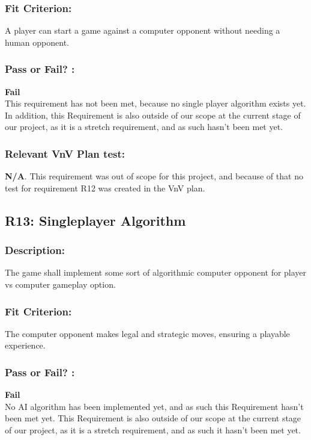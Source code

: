 \documentclass[12pt, titlepage]{article}
\begin{document}
\subsubsection*{Fit Criterion:} A player can start a game against a computer opponent without needing a human opponent.

\subsubsection*{Pass or Fail? :} 

 \noindent \textbf{Fail}\\
 
 This requirement has not been met, because no single player algorithm exists yet. In addition, this Requirement is also outside of our scope at the current stage of our project, as it is a stretch requirement, and as such hasn't been met yet.

\subsubsection*{Relevant VnV Plan test: } \textbf{N/A}. This requirement was out of scope for this project, and because of that no test for requirement R12 was created in the VnV plan.


\subsection{R13: Singleplayer Algorithm} 
\label{R13} 

\subsubsection*{Description:} The game shall implement some sort of algorithmic computer opponent for  player vs computer gameplay option.

\subsubsection*{Fit Criterion:} The computer opponent makes legal and strategic moves, ensuring a playable experience.

\subsubsection*{Pass or Fail? :} 

 \noindent \textbf{Fail}\\
 
  No AI algorithm has been implemented yet, and as such this Requirement hasn't been met yet. This Requirement is also outside of our scope at the current stage of our project, as it is a stretch requirement, and as such it hasn't been met yet.
\end{document}
